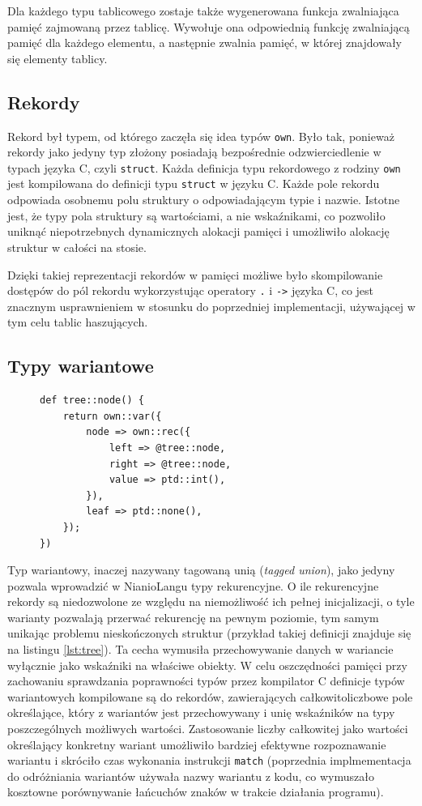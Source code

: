 \documentclass[licencjacka]{pracamgr}
\begin{document}
Dla każdego typu tablicowego zostaje także wygenerowana funkcja zwalniająca pamięć zajmowaną
przez tablicę. Wywołuje ona odpowiednią funkcję zwalniającą pamięć dla każdego elementu,
a następnie zwalnia pamięć, w której znajdowały się elementy tablicy.
\subsection{Rekordy}
Rekord był typem, od którego zaczęła się idea typów \texttt{own}. Było tak, ponieważ rekordy jako jedyny
typ złożony posiadają bezpośrednie odzwierciedlenie w typach języka C, czyli \texttt{struct}.
Każda definicja typu rekordowego z rodziny \texttt{own} jest kompilowana do definicji typu \texttt{struct}
w języku C. Każde pole rekordu odpowiada osobnemu polu struktury o odpowiadającym typie i nazwie.
Istotne jest, że typy pola struktury są wartościami, a nie wskaźnikami, co pozwoliło uniknąć niepotrzebnych
dynamicznych alokacji pamięci i umożliwiło alokację struktur w całości na stosie.

Dzięki takiej reprezentacji rekordów w pamięci możliwe było skompilowanie dostępów do pól rekordu wykorzystując
operatory \texttt{.} i \texttt{->} języka C, co jest znacznym usprawnieniem w stosunku do poprzedniej implementacji,
używającej w tym celu tablic haszujących.
\subsection{Typy wariantowe}
\begin{figure}
\begin{lstlisting}[caption={Rekurencyjna definicja struktury drzewiastej},label={lst:tree},aboveskip=-15pt]
def tree::node() {
    return own::var({
        node => own::rec({
            left => @tree::node,
            right => @tree::node,
            value => ptd::int(),
		}),
        leaf => ptd::none(),
	});
})
\end{lstlisting}
\end{figure}
Typ wariantowy, inaczej nazywany tagowaną unią (\textit{tagged union}), jako jedyny pozwala wprowadzić
w NianioLangu typy rekurencyjne. O ile rekurencyjne rekordy są niedozwolone ze względu na niemożliwość ich
pełnej inicjalizacji, o tyle warianty pozwalają przerwać rekurencję na pewnym poziomie, tym samym unikając
problemu nieskończonych struktur (przykład takiej definicji znajduje się na listingu \ref{lst:tree}).
Ta cecha wymusiła przechowywanie danych w wariancie wyłącznie jako wskaźniki na właściwe obiekty.
W celu oszczędności pamięci przy zachowaniu sprawdzania poprawności typów przez kompilator C definicje typów
wariantowych kompilowane są do rekordów, zawierających całkowitoliczbowe pole określające, który z wariantów
jest przechowywany i unię wskaźników na typy poszczególnych możliwych wartości.
Zastosowanie liczby całkowitej jako wartości określający konkretny wariant umożliwiło bardziej efektywne
rozpoznawanie wariantu i skróciło czas wykonania instrukcji \texttt{match} (poprzednia implmementacja do
odróżniania wariantów używała nazwy wariantu z kodu, co wymuszało kosztowne porównywanie łańcuchów znaków
w trakcie działania programu).
\end{document}

